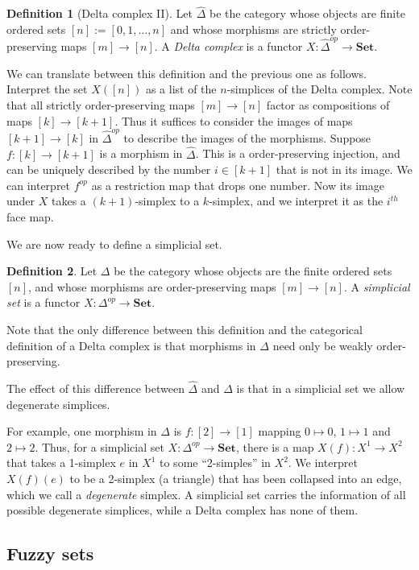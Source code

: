\documentclass[a4paper,11pt,leqno]{article} \usepackage{amsmath}
\theoremstyle{definition}
\newtheorem{defn}{Definition}
\begin{document}
\begin{defn}[Delta complex II]
  Let $\hat{\Delta}$ be the category whose objects are finite ordered sets $[n]
  := [0,1,\dots,n]$ and whose morphisms are strictly order-preserving maps
  $[m]\to[n]$.
  A \emph{Delta complex} is a functor $X: \hat{\Delta}^{op}\to \textbf{Set}$.
\end{defn}

We can translate between this definition and the previous one as follows.
Interpret the set $X([n])$ as a list of the $n$-simplices of the Delta complex.
Note that all strictly order-preserving maps $[m]\to[n]$ factor as compositions
of maps $[k]\to[k+1]$.
Thus it suffices to consider the images of maps $[k+1]\to[k]$ in
$\hat{\Delta}^{op}$ to describe the images of the morphisms.
Suppose $f: [k]\to[k+1]$ is a morphism in $\hat{\Delta}$.
This is a order-preserving injection, and can be uniquely described by the
number $i\in[k+1]$ that is not in its image.
We can interpret $f^{op}$ as a restriction map that drops one number.
Now its image under $X$ takes a $(k+1)$-simplex to a $k$-simplex, and we
interpret it as the $i^{th}$ face map.

We are now ready to define a simplicial set.

\begin{defn}
  Let $\Delta$ be the category whose objects are the finite ordered sets $[n]$,
  and whose morphisms are order-preserving maps $[m]\to[n]$.
  A \emph{simplicial set} is a functor $X: \Delta^{op}\to \textbf{Set}$.
\end{defn}

Note that the only difference between this definition and the categorical
definition of a Delta complex is that morphisms in $\Delta$ need only be weakly
order-preserving.

The effect of this difference between $\hat{\Delta}$ and $\Delta$ is that in
a simplicial set we allow degenerate simplices.

For example, one morphism in $\Delta$ is $f:[2]\to[1]$ mapping $0\mapsto 0$,
$1\mapsto 1$ and $2\mapsto 2$.
Thus, for a simplicial set $X: \Delta^{op}\to\textbf{Set}$, there is a map
$X(f): X^1\to X^2$ that takes a 1-simplex $e$ in $X^1$ to some ``2-simples'' in
$X^2$.
We interpret $X(f)(e)$ to be a 2-simplex (a triangle) that has been collapsed
into an edge, which we call a \emph{degenerate} simplex.
A simplicial set carries the information of all possible degenerate simplices,
while a Delta complex has none of them.

\subsection{Fuzzy sets}
\end{document}
